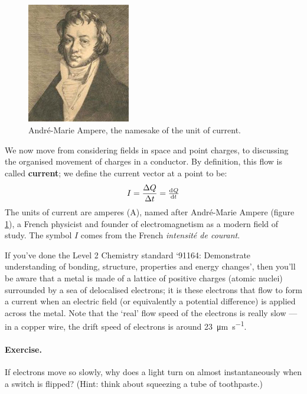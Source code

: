 \documentclass[a4paper]{amsbook}
\newcommand\capcite[1]{}
\begin{document}
\begin{figure}
  \centering
  \includegraphics[width=0.4\textwidth]{ampere}
  \caption{Andr\'e-Marie Ampere, the namesake of the unit of current. \capcite{http://www.nndb.com/people/574/000097283/ampere-1.jpg}\label{fig:ampere}}
\end{figure}
We now move from considering fields in space and point charges, to discussing the organised movement
of charges in a conductor. By definition, this flow is called \textbf{current}; we define the current vector
at a point to be:
\begin{equation}
  I = \frac{\Delta Q}{\Delta t} = \od{Q}{t}
\end{equation}
The units of current are amperes (A), named after Andr\'e-Marie Ampere (figure \ref{fig:ampere}), a French physicist and founder
of electromagnetism as a modern field of study. The symbol $ I $ comes from the French \textit{intensit\'e de courant}.

If you've done the Level 2 Chemistry standard `91164: Demonstrate understanding of bonding, structure, properties and energy changes',
then you'll be aware that a metal is made of a lattice of positive charges (atomic nuclei) surrounded by a sea of delocalised electrons;
it is these electrons that flow to form a current when an electric field (or equivalently a potential difference) is applied across the
metal. Note that the `real' flow speed of the electrons is really slow --- in a copper wire, the drift speed of electrons is around
\SI{23}{\micro\metre\per\second}.

\paragraph{Exercise.} If electrons move so slowly, why does a light turn on almost instantaneously when a switch is flipped? (Hint: think
about squeezing a tube of toothpaste.)
\end{document}
